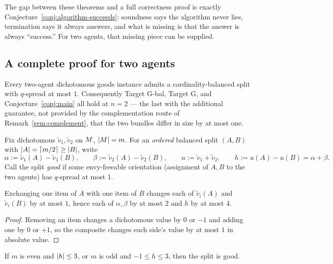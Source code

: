 The gap between these theorems and a full correctness proof is exactly
Conjecture~\ref{conj:algorithm-succeeds}: soundness says the algorithm never
lies, termination says it always answers, and what is missing is that the
answer is always ``success.'' For two agents, that missing piece can be
supplied.

\subsection{A complete proof for two agents}
\label{sec:n2-proof}

\begin{theorem}[Completeness at $n = 2$]
\label{thm:n2-complete}
Every two-agent dichotomous goods instance admits a cardinality-balanced split
with $q$-spread at most $1$. Consequently Target G-bal, Target G, and
Conjecture~\ref{conj:main} all hold at $n = 2$ --- the last with the additional
guarantee, not provided by the complementation route of
Remark~\ref{rem:complement}, that the two bundles differ in size by at most
one.
\end{theorem}

Fix dichotomous $\tilde{v}_1, \tilde{v}_2$ on $M$, $\left\lvert M\right\rvert = m$. For
an \emph{ordered} balanced split $(A, B)$ with $\left\lvert A\right\rvert = \lceil m/2 \rceil
\ge \left\lvert B\right\rvert$, write
\[
  \alpha := \tilde{v}_1(A) - \tilde{v}_1(B), \qquad
  \beta := \tilde{v}_2(A) - \tilde{v}_2(B), \qquad
  u := \tilde{v}_1 + \tilde{v}_2, \qquad
  h := u(A) - u(B) = \alpha + \beta .
\]
Call the split \emph{good} if some envy-freeable orientation (assignment of
$A, B$ to the two agents) has $q$-spread at most $1$.

\begin{lemma}
\label{lem:swapstep}
Exchanging one item of $A$ with one item of $B$ changes each of
$\tilde{v}_i(A)$ and $\tilde{v}_i(B)$ by at most $1$, hence each of
$\alpha, \beta$ by at most $2$ and $h$ by at most $4$.
\end{lemma}

\begin{proof}
Removing an item changes a dichotomous value by $0$ or $-1$ and adding one by
$0$ or $+1$, so the composite changes each side's value by at most $1$ in
absolute value.
\end{proof}

\begin{lemma}[Window]
\label{lem:window}
If $m$ is even and $\left\lvert h\right\rvert \le 3$, or $m$ is odd and $-1 \le h \le 3$, then
the split is good.
\end{lemma}

